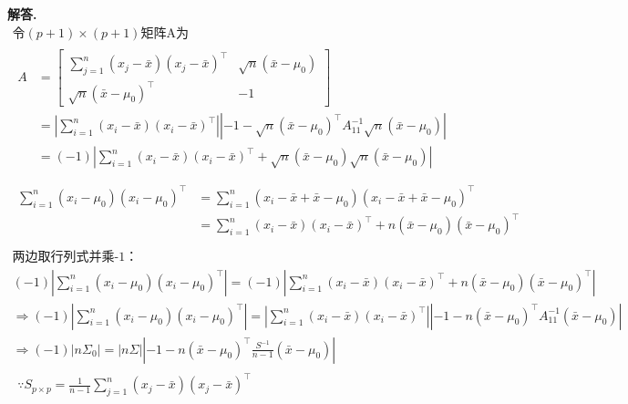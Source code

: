 \documentclass[12pt, a4paper, oneside]{ctexart}
\newenvironment{solution}{\par\noindent\textbf{解答. }}{\par}
\begin{document}
\begin{solution}
    \[
        \begin{gathered}
            \text{令} (p+1)\times(p+1) \text{矩阵A为}\\
            \begin{aligned}
                A&=\begin{bmatrix}
                    \sum_{j=1}^{n}(x_j-\bar{x})(x_j-\bar{x})^\top & \sqrt{n}(\bar{x}-\mu_0)\\
                    \sqrt{n}(\bar{x}-\mu_0)^\top & -1
                \end{bmatrix}\\
                &=\left|{\sum_{i=1}^{n}(x_i-\bar{x})(x_i-\bar{x})^\top}\right| \left|{-1-\sqrt{n}(\bar{x}-\mu_0)^\top A_{11}^{-1} \sqrt{n}(\bar{x}-\mu_0)} \right|\\
                &=(-1)\left|\sum_{i=1}^{n}(x_i-\bar{x})(x_i-\bar{x})^\top+\sqrt{n}(\bar{x}-\mu_0)\sqrt{n}(\bar{x}-\mu_0)\right|\\
            \end{aligned}\\
            \boxed{
                \begin{aligned}
                    \sum_{i=1}^{n}(x_i-\mu_0)(x_i-\mu_0)^\top
                    &=\sum_{i=1}^{n}(x_i-\bar{x}+\bar{x}-\mu_0)(x_i-\bar{x}+\bar{x}-\mu_0)^\top\\
                    &=\sum_{i=1}^{n}(x_i-\bar{x})(x_i-\bar{x})^\top+n(\bar{x}-\mu_0)(\bar{x}-\mu_0)^\top\\
                \end{aligned}
                }\\
            \text{两边取行列式并乘-1：}\\
            (-1) \left| \sum_{i=1}^{n}(x_i-\mu_0)(x_i-\mu_0)^\top \right|= (-1) \left| \sum_{i=1}^{n}(x_i-\bar{x})(x_i-\bar{x})^\top+n(\bar{x}-\mu_0)(\bar{x}-\mu_0)^\top \right|\\
            \Rightarrow (-1) \left| \sum_{i=1}^{n}(x_i-\mu_0)(x_i-\mu_0)^\top \right| = \left| \sum_{i=1}^{n}(x_i-\bar{x})(x_i-\bar{x})^\top \right| \left| {-1-n(\bar{x}-\mu_0)^\top A_{11}^{-1}(\bar{x}-\mu_0)} \right|\\
            \Rightarrow (-1) \left| n\Sigma_0 \right| = \left| n\Sigma \right| \left| -1-n(\bar{x}-\mu_0)^\top \frac{S^{-1}}{n-1} (\bar{x}-\mu_0)  \right|\\
            \boxed{
                \begin{gathered}
                \because S_{p\times p} = \frac{1}{n-1} \sum_{j=1}^{n}(x_j-\bar{x})(x_j-\bar{x})^\top\\

\end{gathered}}
\end{gathered}\]
\end{solution}
\end{document}
